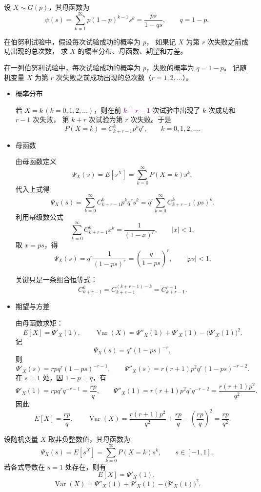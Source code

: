 \begin{example}[几何分布的母函数]
设 $X \sim G(p)$，其母函数为
\[
\psi(s)
= \sum_{k=1}^{\infty} p(1-p)^{k-1} s^{k}
= \frac{ps}{1-qs},\qquad q = 1-p.
\]
\end{example}
\begin{homework}[4.15]
在伯努利试验中，假设每次试验成功的概率为 $p$，
如果记 $X$ 为第 $r$ 次失败之前成功出现的总次数，
求 $X$ 的概率分布、母函数、期望和方差。
\end{homework}
\begin{solution}
在一列伯努利试验中，每次试验成功的概率为 $p$，失败的概率为 $q=1-p$。
记随机变量 $X$ 为第 $r$ 次失败之前成功出现的总次数（$r=1,2,\dots$）。

\begin{itemize}
  \item[(1)] 概率分布

  若 $X=k\,(k=0,1,2,\dots)$，则在前 \textcolor{purple}{$k+r-1$ }次试验中出现了 $k$ 次成功和 $r-1$ 次失败，
  第 $k+r$ 次试验为第 $r$ 次失败。于是
  \[
  P(X=k) = C_{k+r-1}^{k} p^{k} q^{r},\qquad k=0,1,2,\dots.
  \]

  \item[(2)] 母函数

  由母函数定义
  \[
  \Psi_X(s)=E[s^X]=\sum_{k=0}^{\infty}P(X=k)s^k,
  \]
  代入上式得
  \[
  \Psi_X(s)
  = \sum_{k=0}^{\infty} C_{k+r-1}^{k} p^{k} q^{r} s^{k}
  = q^{r} \sum_{k=0}^{\infty} C_{k+r-1}^{k} (ps)^{k}.
  \]
  利用幂级数公式
  \[
  \sum_{k=0}^{\infty} C_{k+r-1}^{k} x^{k} = \frac{1}{(1-x)^{r}},\qquad |x|<1,
  \]
  取 $x=ps$，得
  \[
  \Psi_X(s)=q^{r}\frac{1}{(1-ps)^{r}}
  = \left(\frac{q}{1-ps}\right)^{r},\qquad |ps|<1.
  \]
  \begin{dxtips}[他和要背的负二项分布是一样的]
      关键只是一条组合恒等式：
\[
C_{k+r-1}^{k}
= C_{k+r-1}^{(k+r-1)-k}
= C_{k+r-1}^{r-1}.
\]
  \end{dxtips}
  \item[(3)] 期望与方差

  由母函数求矩：
  \[
  E[X]=\Psi'_X(1),\qquad
  \operatorname{Var}(X)=\Psi''_X(1)+\Psi'_X(1)-\bigl(\Psi'_X(1)\bigr)^2.
  \]
  记
  \[
  \Psi_X(s)=q^{r}(1-ps)^{-r},
  \]
  则
  \[
  \Psi'_X(s)=r p q^{r} (1-ps)^{-r-1},\qquad
  \Psi''_X(s)=r(r+1)p^{2} q^{r} (1-ps)^{-r-2}.
  \]
  在 $s=1$ 处，因 $1-p=q$，有
  \[
  \Psi'_X(1)=r p q^{r} q^{-r-1}=\frac{r p}{q},\qquad
  \Psi''_X(1)=r(r+1)p^{2} q^{r} q^{-r-2}
  =\frac{r(r+1)p^{2}}{q^{2}}.
  \]
  因此
  \[
  E[X]=\frac{r p}{q},\qquad
  \operatorname{Var}(X)
  =\frac{r(r+1)p^{2}}{q^{2}}+\frac{r p}{q}-\left(\frac{r p}{q}\right)^{2}
  =\frac{r p}{q^{2}}.
  \]
\end{itemize}
\end{solution}
\begin{definition}
设随机变量 $X$ 取非负整数值，其母函数为
\[
\Psi_X(s)=E[s^X]=\sum_{k=0}^{\infty}P(X=k)s^k,\qquad s\in[-1,1].
\]
若各式导数在 $s=1$ 处存在，则有
\[
E[X]=\Psi'_X(1),
\]
\[
\operatorname{Var}(X)=\Psi''_X(1)+\Psi'_X(1)-\bigl(\Psi'_X(1)\bigr)^2.
\]
\end{definition}

